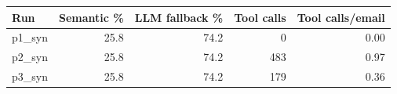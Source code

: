 \begin{tabular}{lrrrr}
\toprule
Run & Semantic \% & LLM fallback \% & Tool calls & Tool calls/email \\
\midrule
p1\_syn & 25.8 & 74.2 & 0 & 0.00 \\
p2\_syn & 25.8 & 74.2 & 483 & 0.97 \\
p3\_syn & 25.8 & 74.2 & 179 & 0.36 \\
\bottomrule
\end{tabular}
